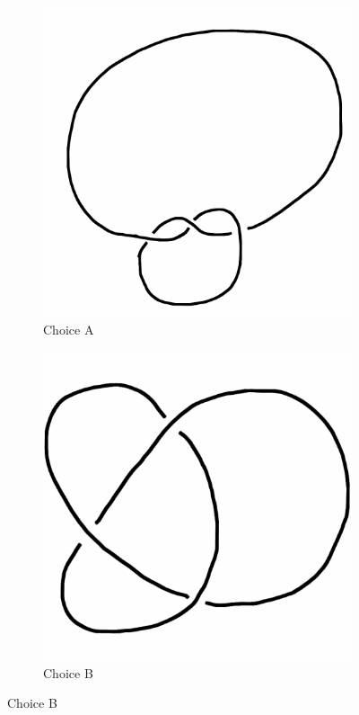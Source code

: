 \documentclass[12pt,letterpaper]{article}
\theoremstyle{definition}
\begin{document}
\begin{figure}[h!]
    \begin{subfigure}[b]{0.4\textwidth}
        \includegraphics[width=\textwidth]{meeting06pics/9SeptQ2a.png}
        \caption{Choice A}
    \end{subfigure}
    \hspace{2cm}
    \begin{subfigure}[b]{0.4\textwidth}
        \includegraphics[width=\textwidth]{meeting06pics/9SeptQ2b.png}
        \caption{Choice B}
    \end{subfigure}
\end{figure}
\end{document}
